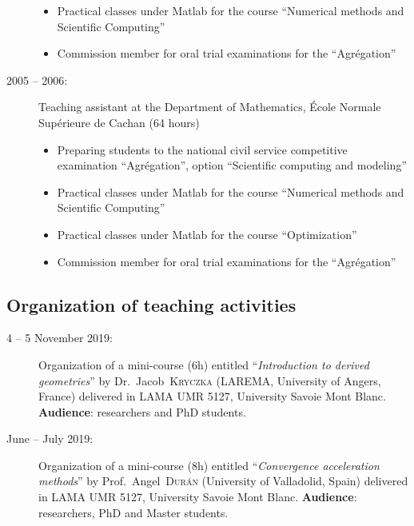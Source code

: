 \documentclass[final, a4paper, oneside, 12pt]{article}
\numberwithin{equation}{section}
\begin{document}
\begin{description}
\begin{itemize}
    \item Practical classes under Matlab for the course ``Numerical methods and Scientific Computing''
    
    \item Commission member for oral trial examinations for the ``Agr\'egation''
  \end{itemize}
  
  \item[2005 -- 2006:] Teaching assistant at the Department of Mathematics, \'Ecole Normale Sup\'erieure de Cachan (64 hours)
  \begin{itemize}
    \item Preparing students to the national civil service competitive examination ``Agr\'egation'', option ``Scientific computing and modeling''
    
    \item Practical classes under Matlab for the course ``Numerical methods and Scientific Computing''
    
    \item Practical classes under Matlab for the course ``Optimization''
    
    \item Commission member for oral trial examinations for the ``Agr\'egation''
  \end{itemize}
  
\end{description}

\subsection{Organization of teaching activities}

\begin{description}

  \item[4 -- 5 November 2019:] Organization of a mini-course (6h) entitled ``\textit{Introduction to derived geometries}'' by Dr.~Jacob~\textsc{Kryczka} (LAREMA, University of Angers, France) delivered in LAMA UMR 5127, University Savoie Mont Blanc. \textbf{Audience}: researchers and PhD students.

  \item[June -- July 2019:] Organization of a mini-course (8h) entitled ``\textit{Convergence acceleration methods}'' by Prof.~Angel~\textsc{Dur\'an} (University of Valladolid, Spain) delivered in LAMA UMR 5127, University Savoie Mont Blanc. \textbf{Audience}: researchers, PhD and Master students.

\end{description}
\end{document}
